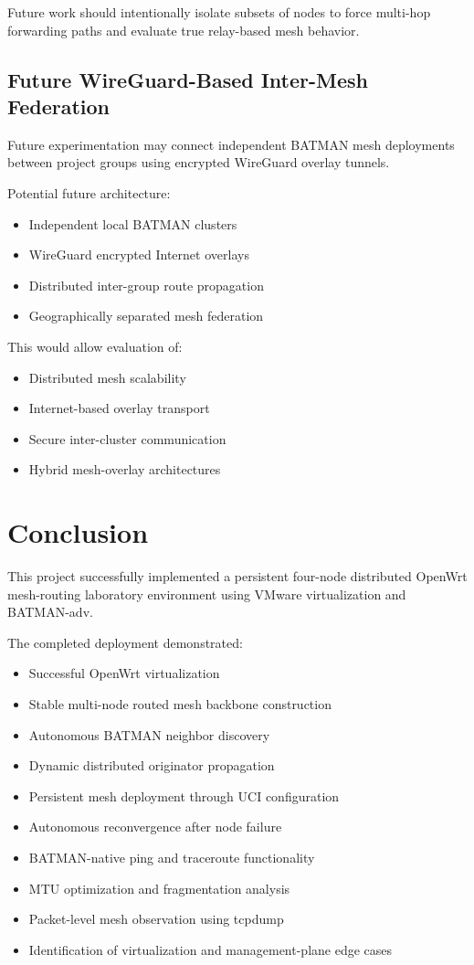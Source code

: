 \documentclass[conference]{IEEEtran}
\begin{document}
Future work should intentionally isolate subsets of nodes to force multi-hop forwarding paths and evaluate true relay-based mesh behavior.

\subsection{Future WireGuard-Based Inter-Mesh Federation}

Future experimentation may connect independent BATMAN mesh deployments between project groups using encrypted WireGuard overlay tunnels.

Potential future architecture:

\begin{itemize}
    \item Independent local BATMAN clusters
    \item WireGuard encrypted Internet overlays
    \item Distributed inter-group route propagation
    \item Geographically separated mesh federation
\end{itemize}

This would allow evaluation of:
\begin{itemize}
    \item Distributed mesh scalability
    \item Internet-based overlay transport
    \item Secure inter-cluster communication
    \item Hybrid mesh-overlay architectures
\end{itemize}

\section{Conclusion}

This project successfully implemented a persistent four-node distributed OpenWrt mesh-routing laboratory environment using VMware virtualization and BATMAN-adv.

The completed deployment demonstrated:

\begin{itemize}
    \item Successful OpenWrt virtualization
    \item Stable multi-node routed mesh backbone construction
    \item Autonomous BATMAN neighbor discovery
    \item Dynamic distributed originator propagation
    \item Persistent mesh deployment through UCI configuration
    \item Autonomous reconvergence after node failure
    \item BATMAN-native ping and traceroute functionality
    \item MTU optimization and fragmentation analysis
    \item Packet-level mesh observation using tcpdump
    \item Identification of virtualization and management-plane edge cases
\end{itemize}
\end{document}
